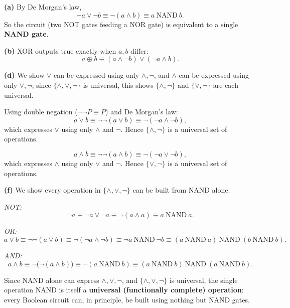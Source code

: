 \documentclass[11pt]{article}
\begin{document}
\begin{solution}
\textbf{(a)} By De Morgan's law,
\[
\neg a\vee\neg b \equiv \neg(a\wedge b) \equiv a\ \text{NAND}\ b.
\]
So the circuit (two NOT gates feeding a NOR gate) is equivalent to a single \textbf{NAND gate}.

\bigskip
\textbf{(b)} XOR outputs true exactly when $a,b$ differ:
\[
a\oplus b \equiv (a\wedge\neg b)\vee(\neg a\wedge b).
\]

\bigskip
\textbf{(d)} We show $\vee$ can be expressed using only $\wedge,\neg$, and $\wedge$ can be expressed using only $\vee,\neg$; since $\{\wedge,\vee,\neg\}$ is universal, this shows $\{\wedge,\neg\}$ and $\{\vee,\neg\}$ are each universal.

Using double negation ($\neg\neg P\equiv P$) and De Morgan's law:
\[
a\vee b \equiv \neg\neg(a\vee b) \equiv \neg(\neg a\wedge\neg b),
\]
which expresses $\vee$ using only $\wedge$ and $\neg$. Hence $\{\wedge,\neg\}$ is a universal set of operations.

\[
a\wedge b \equiv \neg\neg(a\wedge b) \equiv \neg(\neg a\vee\neg b),
\]
which expresses $\wedge$ using only $\vee$ and $\neg$. Hence $\{\vee,\neg\}$ is a universal set of operations.

\bigskip
\textbf{(f)} We show every operation in $\{\wedge,\vee,\neg\}$ can be built from NAND alone.

\smallskip
\noindent\textit{NOT:}
\[
\neg a \equiv \neg a\vee\neg a \equiv \neg(a\wedge a) \equiv a\ \text{NAND}\ a.
\]

\smallskip
\noindent\textit{OR:}
\[
a\vee b \equiv \neg\neg(a\vee b) \equiv \neg(\neg a\wedge\neg b) \equiv \neg a\ \text{NAND}\ \neg b \equiv (a\ \text{NAND}\ a)\ \text{NAND}\ (b\ \text{NAND}\ b).
\]

\smallskip
\noindent\textit{AND:}
\[
a\wedge b \equiv \neg\big(\neg(a\wedge b)\big) \equiv \neg(a\ \text{NAND}\ b) \equiv (a\ \text{NAND}\ b)\ \text{NAND}\ (a\ \text{NAND}\ b).
\]

\smallskip
Since NAND alone can express $\wedge,\vee,\neg$, and $\{\wedge,\vee,\neg\}$ is universal, the single operation NAND is itself a \textbf{universal (functionally complete) operation}: every Boolean circuit can, in principle, be built using nothing but NAND gates.
\end{solution}
\end{document}
